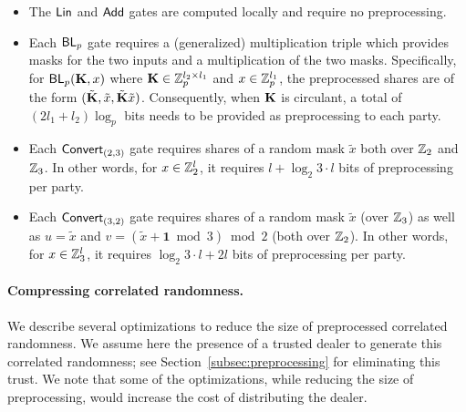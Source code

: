 \begin{itemize}
\item The $\textnormal{\textsf{Lin}}$ and $\textnormal{\textsf{Add}}$ gates are computed locally and require no preprocessing.

\item Each $\textnormal{\textsf{BL}}_p$ gate requires a (generalized) multiplication triple which provides masks for the two inputs and a multiplication of the two masks. Specifically, for $\BLMap_p(\mat{K}, x)$ where $\mat{K} \in \Z_p^{l_2 \times l_1}$ and $x \in \mathbb{Z}_p^{l_1}$, the preprocessed shares are of the form $(\tilde{\mat{K}}, \tilde{x}, \tilde{\mat{K}}\tilde{x})$. Consequently, when $\mat{K}$ is circulant, a total of $(2l_1 + l_2) \log_p$ bits needs to be provided as preprocessing to each party.

\item Each $\textnormal{\textsf{Convert}}_{(2,3)}$ gate requires shares of a random mask $\tilde{x}$ both over $\mathbb{Z}_2$ and $\mathbb{Z}_3$. In other words, for $x \in \mathbb{Z}_2^l$, it requires $l + \log_2{3} \cdot l$ bits of preprocessing per party.

\item Each $\textnormal{\textsf{Convert}}_{(3,2)}$ gate requires shares of a random mask $\tilde{x}$ (over $\mathbb{Z}_3$) as well as $u = \tilde{x}$ and $v = (\tilde{x} + \textbf{1} \bmod 3)\bmod 2$ (both over $\mathbb{Z}_2$). In other words, for $x \in \mathbb{Z}_3^l$, it requires $\log_2{3} \cdot l + 2l$ bits of preprocessing per party.
\end{itemize}

\paragraph{Compressing correlated randomness.}
We describe several optimizations to reduce the size of preprocessed correlated randomness. We assume here the presence of a trusted dealer to generate this correlated randomness; see  Section~\ref{subsec:preprocessing} for eliminating this trust. We note that some of the optimizations, while reducing the size of preprocessing, would increase the cost of distributing the dealer.

